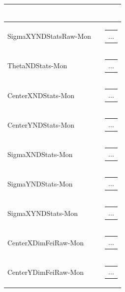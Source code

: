 \documentclass[openany]{article}
\begin{document}
\begin{longtable}{| m{3.0cm} m{4.5cm} m{7.0cm} |}
\begin{tabular}{@{}m{6cm}@{}}
            \end{tabular} \hypertarget{}{}\\ \hline
        SigmaXYNDStatsRaw-Mon &  & \begin{tabular}{@{}m{6cm}@{}}
                ...
            \end{tabular} \hypertarget{}{}\\ \hline
        ThetaNDStats-Mon &  & \begin{tabular}{@{}m{6cm}@{}}
                ...
            \end{tabular} \hypertarget{}{}\\ \hline
        CenterXNDStats-Mon &  & \begin{tabular}{@{}m{6cm}@{}}
                ...
            \end{tabular} \hypertarget{}{}\\ \hline
        CenterYNDStats-Mon &  & \begin{tabular}{@{}m{6cm}@{}}
                ...
            \end{tabular} \hypertarget{}{}\\ \hline
        SigmaXNDStats-Mon &  & \begin{tabular}{@{}m{6cm}@{}}
                ...
            \end{tabular} \hypertarget{}{}\\ \hline
        SigmaYNDStats-Mon &  & \begin{tabular}{@{}m{6cm}@{}}
                ...
            \end{tabular} \hypertarget{}{}\\ \hline
        SigmaXYNDStats-Mon &  & \begin{tabular}{@{}m{6cm}@{}}
                ...
            \end{tabular} \hypertarget{}{}\\ \hline
        CenterXDimFeiRaw-Mon &  & \begin{tabular}{@{}m{6cm}@{}}
                ...
            \end{tabular} \hypertarget{}{}\\ \hline
        CenterYDimFeiRaw-Mon &  & \begin{tabular}{@{}m{6cm}@{}}
                ...
            \end{tabular} \hypertarget{}{}\\ \hline

\end{longtable}
\end{document}
